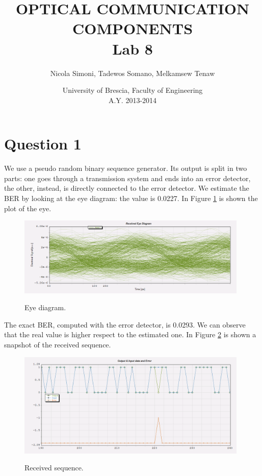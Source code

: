 \documentclass[a4paper,10pt]{report}
\title{\textbf{OPTICAL COMMUNICATION COMPONENTS \\ Lab 8}}
\author{Nicola Simoni, Tadewos Somano, Melkamsew Tenaw}
\date{University of Brescia, Faculty of Engineering\\A.Y. 2013-2014}
\begin{document}
\maketitle


\section*{Question 1}
We use a pseudo random binary sequence generator. Its output is split in two parts: one goes through a transmission system and
ends into an error detector, the other, instead, is directly connected to the error detector.
We estimate the BER by looking at the eye diagram: the value is 0.0227.
In Figure \ref{q1_2} is shown the plot of the eye.

\begin{figure}[!ht]
   \centering
   \includegraphics[width=11cm]{q1_2.png}\\
   \caption{Eye diagram.}
   \label{q1_2}
\end{figure}

The exact BER, computed with the error detector, is 0.0293. We can observe that the real value is higher respect to the estimated one.
In Figure \ref{q1_1} is shown a snapshot of the received sequence.

\begin{figure}[!ht]
   \centering
   \includegraphics[width=11cm]{q1_1.png}\\
   \caption{Received sequence.}
   \label{q1_1}
\end{figure}
\end{document}
